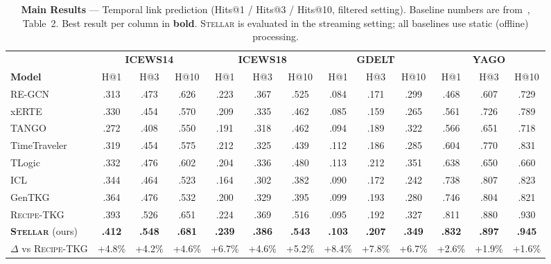\documentclass[10pt,twocolumn]{article}
\theoremstyle{definition}
\newcommand{\recipe}{\textsc{Recipe-TKG}}
\begin{document}
\begin{table}[ht!]
\centering
\caption{%
  \textbf{Main Results} — Temporal link prediction (Hits@1 / Hits@3 / Hits@10,
  filtered setting).
  Baseline numbers are from~\protect\citet{Akgul2025recipe}, Table~2.
  Best result per column in \textbf{bold}.
  \textsc{Stellar} is evaluated in the streaming setting; all baselines use static
  (offline) processing.
}
\label{tab:main}
\scriptsize
\setlength{\tabcolsep}{3.5pt}
\begin{tabular}{l
    @{\hspace{4pt}}ccc
    @{\hspace{4pt}}ccc
    @{\hspace{4pt}}ccc
    @{\hspace{4pt}}ccc}
\toprule
& \multicolumn{3}{c}{\textbf{ICEWS14}}
& \multicolumn{3}{c}{\textbf{ICEWS18}}
& \multicolumn{3}{c}{\textbf{GDELT}}
& \multicolumn{3}{c}{\textbf{YAGO}} \\
\cmidrule(lr){2-4}\cmidrule(lr){5-7}\cmidrule(lr){8-10}\cmidrule(lr){11-13}
\textbf{Model} & H@1 & H@3 & H@10 & H@1 & H@3 & H@10 & H@1 & H@3 & H@10 & H@1 & H@3 & H@10 \\
\midrule
RE-GCN        & .313 & .473 & .626 & .223 & .367 & .525 & .084 & .171 & .299 & .468 & .607 & .729 \\
xERTE         & .330 & .454 & .570 & .209 & .335 & .462 & .085 & .159 & .265 & .561 & .726 & .789 \\
TANGO         & .272 & .408 & .550 & .191 & .318 & .462 & .094 & .189 & .322 & .566 & .651 & .718 \\
TimeTraveler  & .319 & .454 & .575 & .212 & .325 & .439 & .112 & .186 & .285 & .604 & .770 & .831 \\
TLogic        & .332 & .476 & .602 & .204 & .336 & .480 & .113 & .212 & .351 & .638 & .650 & .660 \\
ICL           & .344 & .464 & .523 & .164 & .302 & .382 & .090 & .172 & .242 & .738 & .807 & .823 \\
GenTKG        & .364 & .476 & .532 & .200 & .329 & .395 & .099 & .193 & .280 & .746 & .804 & .821 \\
\recipe{}     & .393 & .526 & .651 & .224 & .369 & .516 & .095 & .192 & .327 & .811 & .880 & .930 \\
\midrule
\textbf{\textsc{Stellar}} (ours)
              & \textbf{.412} & \textbf{.548} & \textbf{.681}
              & \textbf{.239} & \textbf{.386} & \textbf{.543}
              & \textbf{.103} & \textbf{.207} & \textbf{.349}
              & \textbf{.832} & \textbf{.897} & \textbf{.945} \\
$\Delta$ vs \recipe{}
              & {+4.8\%} & {+4.2\%} & {+4.6\%}
              & {+6.7\%} & {+4.6\%} & {+5.2\%}
              & {+8.4\%} & {+7.8\%} & {+6.7\%}
              & {+2.6\%} & {+1.9\%} & {+1.6\%} \\
\bottomrule
\end{tabular}
\end{table}
\end{document}

